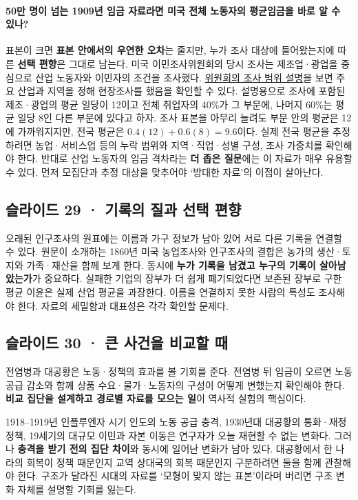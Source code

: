 \documentclass[10pt,a4paper]{article}
\begin{document}
\paragraph{50만 명이 넘는 1909년 임금 자료라면 미국 전체 노동자의 평균임금을 바로 알 수 있나?}
표본이 크면 \textbf{표본 안에서의 우연한 오차}는 줄지만, 누가 조사 대상에 들어왔는지에 따른 \textbf{선택 편향}은 그대로 남는다. 미국 이민조사위원회의 당시 조사는 제조업·광업을 중심으로 산업 노동자와 이민자의 조건을 조사했다. \href{https://www.govinfo.gov/content/pkg/SERIALSET-05661\_00\_00-103-0280-0000/pdf/SERIALSET-05661\_00\_00-103-0280-0000.pdf}{위원회의 조사 범위 설명}을 보면 주요 산업과 지역을 정해 현장조사를 했음을 확인할 수 있다. 설명용으로 조사에 포함된 제조·광업의 평균 일당이 12이고 전체 취업자의 40\%가 그 부문에, 나머지 60\%는 평균 일당 8인 다른 부문에 있다고 하자. 조사 표본을 아무리 늘려도 부문 안의 평균은 12에 가까워지지만, 전국 평균은 $0.4(12)+0.6(8)=9.6$이다. 실제 전국 평균을 추정하려면 농업·서비스업 등의 누락 범위와 지역·직업·성별 구성, 조사 가중치를 확인해야 한다. 반대로 산업 노동자의 임금 격차라는 \textbf{더 좁은 질문}에는 이 자료가 매우 유용할 수 있다. 먼저 모집단과 추정 대상을 맞추어야 ‘방대한 자료’의 이점이 살아난다.\par

\subsection{슬라이드 29 · 기록의 질과 선택 편향}
오래된 인구조사의 원표에는 이름과 가구 정보가 남아 있어 서로 다른 기록을 연결할 수 있다. 원문이 소개하는 1860년 미국 농업조사와 인구조사의 결합은 농가의 생산·토지와 가족·재산을 함께 보게 한다. 동시에 \textbf{누가 기록을 남겼고 누구의 기록이 살아남았는가}가 중요하다. 실패한 기업의 장부가 더 쉽게 폐기되었다면 보존된 장부로 구한 평균 이윤은 실제 산업 평균을 과장한다. 이름을 연결하지 못한 사람의 특성도 조사해야 한다. 자료의 세밀함과 대표성은 각각 확인할 문제다.\par

\subsection{슬라이드 30 · 큰 사건을 비교할 때}
전염병과 대공황은 노동·정책의 효과를 볼 기회를 준다. 전염병 뒤 임금이 오르면 노동 공급 감소와 함께 상품 수요·물가·노동자의 구성이 어떻게 변했는지 확인해야 한다. \textbf{비교 집단을 설계하고 경로별 자료를 모으는 일}이 역사적 실험의 핵심이다.\par

1918–1919년 인플루엔자 시기 인도의 노동 공급 충격, 1930년대 대공황의 통화·재정 정책, 19세기의 대규모 이민과 자본 이동은 연구자가 오늘 재현할 수 없는 변화다. 그러나 \textbf{충격을 받기 전의 집단 차이}와 동시에 일어난 변화가 남아 있다. 대공황에서 한 나라의 회복이 정책 때문인지 교역 상대국의 회복 때문인지 구분하려면 둘을 함께 관찰해야 한다. 구조가 달라진 시대의 자료를 ‘모형이 맞지 않는 표본’이라며 버리면 구조 변화 자체를 설명할 기회를 잃는다.\par
\end{document}
